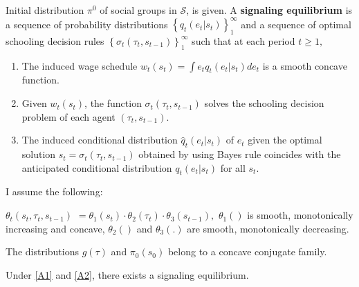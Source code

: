 \documentclass[12pt,svgnames]{article}
\begin{document}
\begin{definition}
\label{def1} Initial distribution $\pi ^{0}$ of social groups in $\mathcal{S}$, is given. A \textbf{signaling equilibrium} is a sequence of probability distributions $\left\{ q_{t}\left( e_{t}|s_{t}\right) \right\} _{1}^{\infty }$ and a sequence of optimal schooling decision rules $\left\{ \sigma _{t}\left( \tau _{t},s_{t-1}\right) \right\} _{1}^{\infty }$ such that at each period $t\geq 1,$

\begin{enumerate}
\item The induced wage schedule $w_{t}\left( s_t\right) =\int e_{t}q_{t}\left(
e_{t}|s_{t}\right)  de_{t}$ is a smooth concave function.

\item Given $w_{t}\left( s_t\right)$, the function $\sigma _{t}\left(\tau
_{t},s_{t-1}\right)$ solves the schooling decision problem of each
agent $\left( \tau _{t},s_{t-1}\right)$.

\item The induced  conditional distribution $\hat{q}_{t}\left( e_{t}|s_{t}\right)$ of $e_{t}$ given the optimal solution 
$s_{t}=\sigma _{t}\left( \tau _{t},s_{t-1}\right)$ obtained by using Bayes
rule coincides with the anticipated conditional distribution $q_{t}\left(
e_{t}|s_{t}\right)$ for all $s_{t}$.
\end{enumerate}
\end{definition}


I assume the following:

\begin{assumption}
\label{A1}$\theta _{t}(s_{t},\tau _{t},s_{t-1})$ $=\theta _{1}\left( s_{t}\right) \cdot \theta _{2}\left( \tau _{t}\right) \cdot \theta _{3}\left( s_{t-1}\right) ,$ $\theta _{1}\left( {}\right)$ is smooth, monotonically increasing and concave, $\theta _{2}\left( {}\right)$ and $\theta _{3}\left( .\right)$ are smooth, monotonically decreasing.
\end{assumption}

\begin{assumption}
\label{A2}The distributions $g\left( \tau \right)$ and $\pi _{0}\left( s_{0}\right)$ belong to a concave conjugate family.
\end{assumption}

\begin{theorem}
Under \autoref{A1} and \autoref{A2}, there exists a signaling equilibrium.
\end{theorem}
\end{document}
